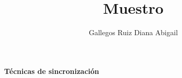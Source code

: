\documentclass[12pt]{article}
\title{Muestro}
\author{Gallegos Ruiz Diana Abigail}
\begin{document}
	\begin{center}
		\Huge\textbf{Técnicas de sincronización}
	\end{center}
	
	
\end{document}

